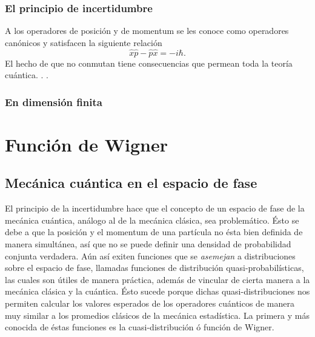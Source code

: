 \documentclass[a4paper]{report}
\begin{document}
  \subsection{El principio de incertidumbre}

  A los operadores de posición y de momentum se les conoce
  como operadores canónicos y satisfacen la siguiente
  relación
  \begin{equation}
    \hat{x} \hat{p} - \hat{p} \hat{x} 
    = -i\hbar.
  \end{equation}
  El hecho de que no conmutan tiene consecuencias que
  permean toda la teoría cuántica. . . 

  \subsection{En dimensión finita}


  \chapter{Función de Wigner}

  \section{Mecánica cuántica en el espacio de fase}

  El principio de la incertidumbre hace que el concepto de
  un espacio de fase de la mecánica cuántica, análogo al de
  la mecánica clásica, sea problemático. Ésto se debe a que
  la posición y el momentum de una partícula no ésta bien
  definida de manera simultánea, así que no se puede definir
  una densidad de probabilidad conjunta verdadera. Aún así
  exiten funciones que se \textit{asemejan} a distribuciones
  sobre el espacio de fase, llamadas funciones de
  distribución quasi-probabilísticas, las cuales son útiles
  de manera práctica, además de vincular de cierta manera a
  la mecánica clásica y la cuántica. Ésto sucede porque
  dichas quasi-distribuciones nos permiten calcular los
  valores esperados de los operadores cuánticos de manera
  muy similar a los promedios clásicos de la mecánica
  estadística. La primera y más conocida de éstas funciones
  es la cuasi-distribución ó función de Wigner.
\end{document}
